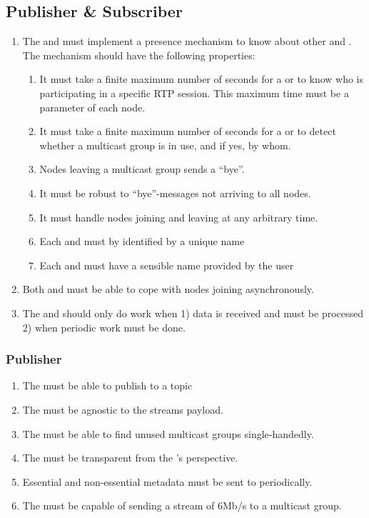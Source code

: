 \subsection{Publisher \& Subscriber}
\begin{enumerate}
		\item The  and  must implement a presence mechanism to know about other  and . The mechanism should have the following properties:
	\begin{enumerate}
		\item It must take a finite maximum number of seconds for a  or  to know who is participating in a specific RTP session. This maximum time must be a parameter of each node.
		\item It must take a finite maximum number of seconds for a  or  to detect whether a multicast group is in use, and if yes, by whom.
		\item Nodes leaving a multicast group sends a ``bye''.
		\item It must be robust to ``bye''-messages not arriving to all nodes.
		\item It must handle nodes joining and leaving at any arbitrary time.
		\item Each \pub{} and \sub{} must by identified by a unique name
 		\item Each \pub{} and \sub{} must have a sensible name provided by the user
	\end{enumerate}
	\item Both  and  must be able to cope with nodes joining asynchronously.
	\item The \pubs and \subs should only do work when 1) data is received and must be processed 2) when periodic work must be done.
\end{enumerate}


\subsubsection*{Publisher}
\begin{enumerate}
	\item The \pubs{} must be able to publish to a topic
	\item The \pub{} must be agnostic to the streams payload.
	\item The  must be able to find unused multicast groups single-handedly.
	\item The \pub must be transparent from the \pro's perspective.
	\item Essential and non-essential metadata must be sent to  periodically.
	\item The \pub{} must be capable of sending a stream of 6Mb/s to a multicast group.
\end{enumerate}

